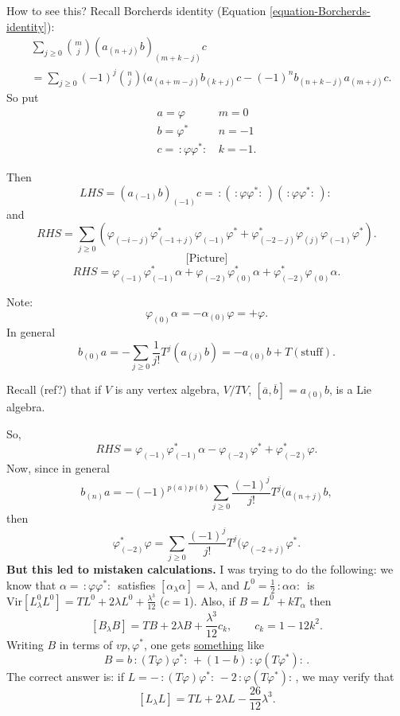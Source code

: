 How to see this?
Recall Borcherds identity (Equation
\ref{equation-Borcherds-identity}):
$$
\begin{aligned}
&\sum_{j \geq
0}\binom{m}{j}(a_{(n+j)}b)_{(m+k-j)}c\\
&=\sum_{j \geq 0}(-1)^j \binom{n}{j}
(a_{(a+m-j)}b_{(k+j)}c-(-1)^nb_{(n+k-j)}
a_{(m+j)}c.
\end{aligned}
$$
So put
$$
\begin{matrix}
a=\varphi & m=0\\
b=\varphi^*  & n=-1\\
c=\,:\!\varphi \varphi ^*\!:\,& k=-1.
\end{matrix}
$$

Then
$$
LHS=(a_{(-1)}b)_{(-1)}c=\,:\!(\,:
\!\varphi\varphi^*\!:\,)
(\,:\!\varphi\varphi^*\!:\,)\!:\,
$$
and
$$
RHS=\sum_{j \geq
0}(\varphi_{(-i-j)}\varphi^*_{(-1+j)}
\varphi_{(-1)}\varphi^*
+\varphi^*_{(-2-j)}\varphi_{(j)}\varphi_{(-1)
}\varphi^*).
$$
$$
\text{[Picture]}
$$
$$
RHS=\varphi_{(-1)}\varphi^*_{(-1)}\alpha+
\varphi_{(-2)}\varphi^*_{(0)}\alpha
+\varphi^*_{(-2)}\varphi_{(0)}\alpha.
$$

Note:
$$
\varphi_{(0)}\alpha=-\alpha_{(0)}\varphi=+
\varphi.
$$
In general
$$
b_{(0)}a=-\sum_{j\geq
0}\frac{1}{j!}T^j(a_{(j)}b)
=-a_{(0)}b+T(\text{stuff}).
$$

\begin{remark}
\label{remark-quotient}
Recall (ref?) that if $V$ is any vertex
algebra,
$V/TV$,
$[\overline{a},\overline{b}]=a_{(0)}b$,
is a Lie algebra.
\end{remark}

\noindent
So,
$$
RHS=\varphi_{(-1)}\varphi^*_{(-1)}\alpha
-\varphi_{(-2)}\varphi^*+\varphi^*_{(-2)}
\varphi.
$$
Now, since in general
$$
b_{(n)}a=-(-1)^{p(a)p(b)}\sum_{j \geq
0}\frac{(-1)^j}{j!}
T^j(a_{(n+j)}b,
$$
then
$$
\varphi^*_{(-2)}\varphi=\sum_{j\geq
0}\frac{(-1)^j}{j!}
T^j(\varphi_{(-2+j)}\varphi^*.
$$
{\bf But this led to mistaken calculations.}
I was trying to do the following: we know
that
$\alpha=\,:\!\varphi \varphi^*\!:\,$
satisfies
$[\alpha_\lambda \alpha]=\lambda$,
and $L^0=\frac{1}{2}\,:\!\alpha \alpha\!:\,$
is
$\text{Vir}[L^0_\lambda L^0]=TL^0+2\lambda
L^0+\frac{\lambda^3}{12}$
($c=1$).
Also, if $B=L^0+kT_\alpha$ then
$$
[B_\lambda B]=TB+2\lambda
B+\frac{\lambda^3}{12}c_k,\qquad
c_k=1-12k^2.
$$
Writing $B$ in terms of $vp,\varphi^*$,
one gets \underline{something} like
$$
B=b\,:\!(T\varphi)\varphi^*\!:\,
+(1-b)\,:\!\varphi(T\varphi^*)\!:\,.
$$
The correct answer is: if
$L=-\,:\!(T\varphi)\varphi^*\!:\,-2\,:
\!\varphi(T\varphi^*)\!:\,$,
we may verify that
$$
[L_\lambda L]=TL+2\lambda L-
\frac{26}{12}\lambda^3.
$$

